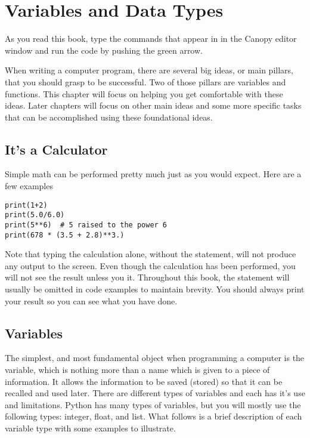 \chapter{Variables and Data Types}
\label{chap:variablesDataTypes}


As you read this book, type the commands that
appear in  in the Canopy editor window and run the code by
pushing the green arrow.


When writing a computer program, there are several big ideas, or main
pillars, that you should grasp to be successful.  Two of those pillars
are variables and functions. This chapter will focus on helping you
get comfortable with these ideas.  Later chapters will focus on other
main ideas and some more specific tasks that can be accomplished using
these foundational ideas.
\section{It's a Calculator}
Simple math can be performed pretty much just as you would
expect. Here are a few examples
\begin{Verbatim}
print(1+2)
print(5.0/6.0)
print(5**6)  # 5 raised to the power 6
print(678 * (3.5 + 2.8)**3.)
\end{Verbatim}
Note that typing the calculation alone, without the 
statement, will not produce any output to the screen.  Even though the
calculation has been performed, you will not see the result unless you
 it. Throughout this book, the 
statement will usually be omitted in code examples to maintain
brevity.  You should always print your result so you can see what you
have done.


\section{Variables}
The simplest, and most fundamental object when programming a computer
is the variable, which is nothing more than a name which is given to a
piece of information. It allows the information to be saved (stored)
so that it can be recalled and used later.   There
are different types of variables and each has it's use and
limitations.  Python has many types of variables, but you will mostly
use the following types: integer, float, and list.  What follows is a
brief description of each variable type with some examples to
illustrate.

